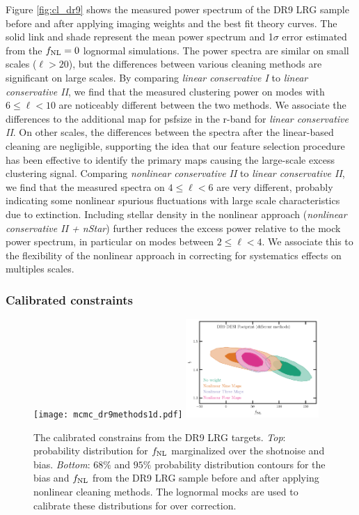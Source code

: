 Figure \ref{fig:cl_dr9} shows the measured power spectrum of the DR9 LRG sample before and after applying imaging weights and the best fit theory curves. The solid link and shade represent the mean power spectrum and 1$\sigma$ error estimated from the $f_{\rm NL}=0$ lognormal simulations. The power spectra are similar on small scales ($\ell > 20$), but the differences between various cleaning methods are significant on large scales. By comparing \textit{linear conservative I} to \textit{linear conservative II}, we find that the measured clustering power on modes with $6\leq \ell < 10$ are noticeably different between the two methods. We associate the differences to the additional map for psfsize in the r-band for \textit{linear conservative II}. On other scales, the differences between the spectra after the linear-based cleaning are negligible, supporting the idea that our feature selection procedure has been effective to identify the primary maps causing the large-scale excess clustering signal. Comparing \textit{nonlinear conservative II} to \textit{linear conservative II}, we find that the measured spectra on $4 \leq \ell < 6$ are very different, probably indicating some nonlinear spurious fluctuations with large scale characteristics due to extinction. Including stellar density in the nonlinear approach (\textit{nonlinear conservative II + nStar}) further reduces the excess power relative to the mock power spectrum, in particular on modes between $2\leq \ell < 4$. We associate this to the flexibility of the nonlinear approach in correcting for systematics effects on multiples scales.

\subsubsection{Calibrated constraints}

\begin{figure}
    \raggedleft
    \texttt{[image: mcmc\_dr9methods1d.pdf]}
    \includegraphics[width=0.45\textwidth]{figures/mcmc_dr9methods.pdf} 
    \caption{The calibrated constrains from the DR9 LRG targets. \textit{Top}: probability distribution for $f_{\rm NL}$ marginalized over the shotnoise and bias. \textit{Bottom}: $68\%$ and $95\%$ probability distribution contours for the bias and $f_{\rm NL}$ from the DR9 LRG sample before and after applying nonlinear cleaning methods. The lognormal mocks are used to calibrate these distributions for over correction.}\label{fig:mcmc_dr9}
\end{figure}

